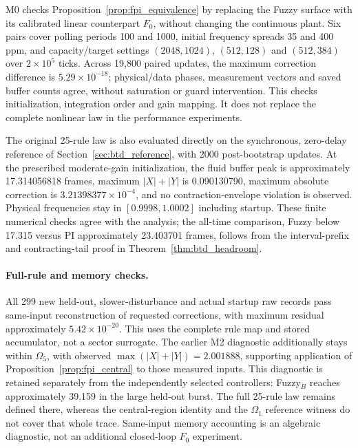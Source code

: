 M0 checks Proposition~\ref{prop:fpi_equivalence} by replacing the Fuzzy
surface with its calibrated linear counterpart $F_0$, without changing
the continuous plant. Six pairs cover polling periods 100 and 1000,
initial frequency spreads 35 and 400 ppm, and capacity/target settings
$(2048,1024)$, $(512,128)$ and $(512,384)$ over $2\times10^5$ ticks.
Across 19,800 paired updates, the maximum correction difference is
$5.29\times10^{-18}$; physical/data phases, measurement vectors and
saved buffer counts agree, without saturation or guard intervention.
This checks initialization, integration order and gain mapping. It does
not replace the complete nonlinear law in the performance experiments.

The original 25-rule law is also evaluated directly on the synchronous,
zero-delay reference of Section~\ref{sec:btd_reference}, with 2000
post-bootstrap updates. At the prescribed moderate-gain initialization,
the fluid buffer peak is approximately 17.314056818 frames, maximum
$|X|+|Y|$ is 0.090130790, maximum absolute correction is
$3.21398377\times10^{-4}$, and no contraction-envelope violation is
observed. Physical frequencies stay in $[0.9998,1.0002]$ including
startup. These finite numerical checks agree with the analysis; the
all-time comparison, Fuzzy below 17.315 versus PI approximately
23.403701 frames, follows from the interval-prefix and contracting-tail
proof in Theorem~\ref{thm:btd_headroom}.

\paragraph{Full-rule and memory checks.}
All 299 new held-out, slower-disturbance and actual startup raw records
pass same-input reconstruction of requested corrections, with maximum
residual approximately $5.42\times10^{-20}$. This uses the complete
rule map and stored accumulator, not a sector surrogate. The earlier
M2 diagnostic additionally stays within $\Omega_5$, with observed
$\max(|X|+|Y|)=2.001888$, supporting application of
Proposition~\ref{prop:fpi_central} to those measured inputs. This
diagnostic is retained separately from the independently selected
controllers: Fuzzy$_B$ reaches approximately 39.159 in the large
held-out burst. The full 25-rule law remains defined there, whereas
the central-region identity and the $\Omega_1$ reference witness do
not cover that whole trace. Same-input memory accounting is an
algebraic diagnostic, not an additional closed-loop $F_0$ experiment.

